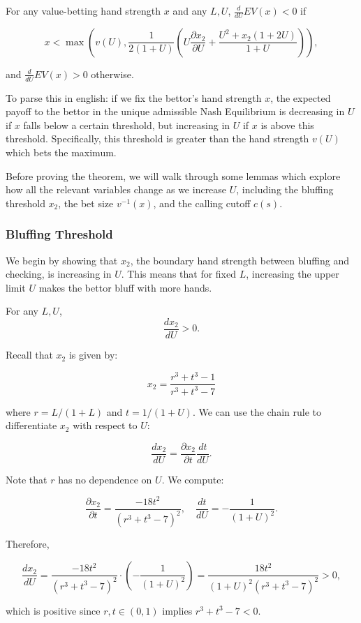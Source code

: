 \documentclass[../../main/main.tex]{subfiles}
\begin{document}
\begin{theorem}
    \label{thm:payoff_increasing}
    For any value-betting hand strength $x$ and any $L, U$, $\frac{d}{dU} EV(x) < 0$ if 
    
    $$x < \max\left(v(U), \frac{1}{2(1+U)} \left( U \frac{\partial x_2}{\partial U} + \frac{U^2 + x_2(1 + 2U)}{1+U} \right) \right),$$

    and $\frac{d}{dU} EV(x) > 0$ otherwise.
\end{theorem}

To parse this in english: if we fix the bettor's hand strength $x$, the expected payoff to the bettor in the unique admissible Nash Equilibrium is decreasing in $U$ if $x$ falls below a certain threshold, but increasing in $U$ if $x$ is above this threshold. Specifically, this threshold is greater than the hand strength $v(U)$ which bets the maximum. 

Before proving the theorem, we will walk through some lemmas which explore how all the relevant variables change as we increase $U$, including the bluffing threshold $x_2$, the bet size $v^{-1}(x)$, and the calling cutoff $c(s)$.

\subsubsection{Bluffing Threshold}

We begin by showing that $x_2$, the boundary hand strength between bluffing and checking, is increasing in $U$. This means that for fixed $L$, increasing the upper limit $U$ makes the bettor bluff with more hands. 

\begin{lemma}
    \label{lem:x2_increasing}
    For any $L, U$,
    $$ \frac{d x_2}{d U} > 0. $$
\end{lemma}

\begin{customproof}
    Recall that $x_2$ is given by:

    \[ x_2 = \frac{r^{3} + t^{3} - 1}{r^{3} + t^{3} - 7} \]

    where $r = L/(1+L)$ and $t = 1/(1+U)$. We can use the chain rule to differentiate $x_2$ with respect to $U$:

    \[ \frac{d x_2}{d U} = \frac{\partial x_2}{\partial t} \frac{d t}{d U}. \]

    Note that $r$ has no dependence on $U$. We compute:

    \[ \frac{\partial x_2}{\partial t} = \frac{-18 t^{2}}{\left(r^{3} + t^{3} - 7\right)^{2}}, \quad \frac{d t}{d U} = - \frac{1}{(1+U)^2}. \]

    Therefore,

    \[ \frac{d x_2}{d U} = \frac{-18 t^{2}}{\left(r^{3} + t^{3} - 7\right)^{2}} \cdot \left(- \frac{1}{(1+U)^2}\right) = \frac{18 t^{2}}{(1+U)^2\left(r^{3} + t^{3} - 7\right)^{2}} > 0, \]

    which is positive since $r, t \in (0, 1)$ implies $r^3 + t^3 - 7 < 0$.

\end{customproof}
\end{document}

